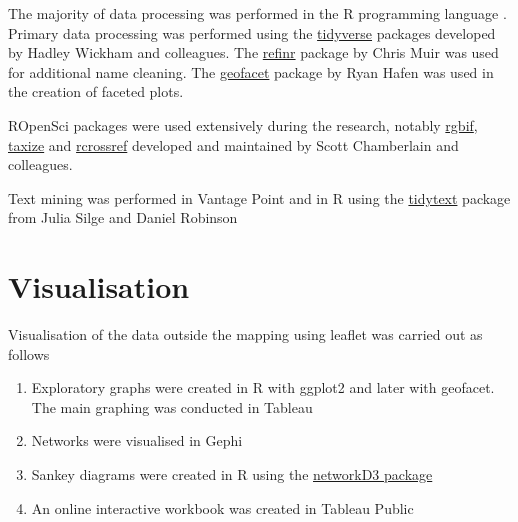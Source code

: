 \documentclass[]{book}
\theoremstyle{definition}
\theoremstyle{definition}
\theoremstyle{definition}
\theoremstyle{remark}
\begin{document}
The majority of data processing was performed in the R programming
language \citep{r_core}. Primary data processing was performed using the
\href{https://github.com/tidyverse/tidyverse}{tidyverse} packages
developed by Hadley Wickham and colleagues. The
\href{https://github.com/ChrisMuir/refinr}{refinr} package by Chris Muir
was used for additional name cleaning. The
\href{https://github.com/hafen/geofacet}{geofacet} package by Ryan Hafen
was used in the creation of faceted plots.

ROpenSci packages were used extensively during the research, notably
\href{https://github.com/ropensci/rgbif}{rgbif},
\href{https://github.com/ropensci/taxize}{taxize} and
\href{https://github.com/ropensci/rcrossref}{rcrossref} developed and
maintained by Scott Chamberlain and colleagues.

Text mining was performed in Vantage Point and in R using the
\href{https://github.com/juliasilge/tidytext}{tidytext} package from
Julia Silge and Daniel Robinson \citep{Fay_2018}

\hypertarget{visualisation}{%
\section{Visualisation}\label{visualisation}}

Visualisation of the data outside the mapping using leaflet was carried
out as follows

\begin{enumerate}
\def\labelenumi{\arabic{enumi}.}
\item
  Exploratory graphs were created in R with ggplot2 and later with
  geofacet. The main graphing was conducted in Tableau
\item
  Networks were visualised in Gephi
\item
  Sankey diagrams were created in R using the
  \href{https://christophergandrud.github.io/networkD3/}{networkD3
  package}
\item
  An online interactive workbook was created in Tableau Public
\end{enumerate}


\end{document}

